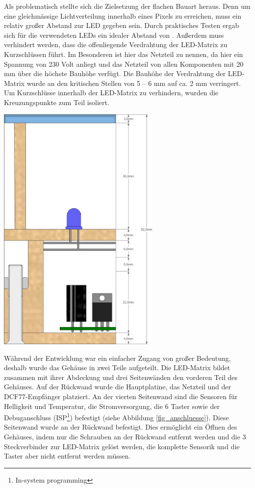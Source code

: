 Als problematisch stellte sich die Zielsetzung der flachen Bauart heraus. Denn um eine gleichmässige Lichtverteilung innerhalb eines Pixels zu erreichen, muss ein relativ großer Abstand zur LED gegeben sein. Durch praktisches Testen ergab sich für die verwendeten LEDs ein idealer Abstand von .%
Außerdem muss verhindert werden, dass die offenliegende Verdrahtung der LED-Matrix zu Kurzschlüssen führt. Im Besonderen ist hier das Netzteil zu nennen, da hier ein Spannung von 230 Volt anliegt und das Netzteil von allen Komponenten mit 20 mm über die höchste Bauhöhe verfügt. 
Die Bauhöhe der Verdrahtung der LED-Matrix wurde an den kritischen Stellen von 5 -- 6 mm auf ca. 2 mm verringert. Um Kurzschlüsse innerhalb der LED-Matrix zu verhindern, wurden die Kreuzungspunkte zum Teil isoliert.
\begin{center}
\includegraphics[width=0.6\textwidth]{skizzen/querschnitt.png}
\label{fig_querschnitt}
\end{center}
Während der Entwicklung war ein einfacher Zugang von großer Bedeutung, deshalb wurde das Gehäuse in zwei Teile aufgeteilt. Die LED-Matrix bildet zusammen mit ihrer Abdeckung und drei Seitenwänden den vorderen Teil des Gehäuses. Auf der Rückwand wurde die Hauptplatine, das Netzteil und der DCF77-Empfänger platziert. An der vierten Seitenwand sind die Sensoren für Helligkeit und Temperatur, die Stromversorgung, die 6 Taster sowie der Debuganschluss (ISP\footnote{In-system programming}) befestigt (siehe Abbildung \ref{fig_anschluesse}). Diese Seitenwand wurde an der Rückwand befestigt. Dies ermöglicht ein Öffnen des Gehäuses, indem nur die Schrauben an der Rückwand entfernt werden und die 3 Steckverbinder zur LED-Matrix gelöst werden, die komplette Sensorik und die Taster aber nicht entfernt werden müssen.%
